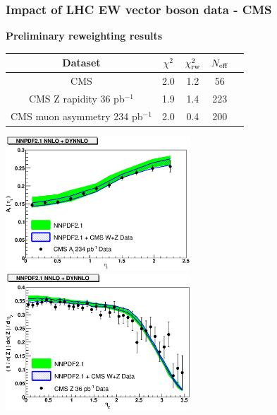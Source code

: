 \documentclass[10pt]{beamer}
\begin{document}
\begin{frame}
\frametitle{Impact of LHC EW vector boson data - CMS}
\textbf{\footnotesize Preliminary reweighting results}
\begin{table}[h]
\scriptsize
\begin{center}
\begin{tabular}{|c|c|c|c|c|}
\hline
Dataset  &  $\chi^2$  &  $\chi^2_{\rm rw} $ & $N_{\rm eff}$  \\
\hline
\hline
CMS  & 2.0       & 1.2   &  56   \\  
\hline
CMS Z rapidity 36 pb$^{-1}$  &    1.9    & 1.4  &  223  \\  
CMS muon asymmetry 234 pb$^{-1}$      &  2.0   & 0.4   & 200   \\  
\hline
\end{tabular}
\end{center}
\end{table}
\begin{center}
\includegraphics[width=0.52\textwidth]{dat-th-cmswlasy}
\includegraphics[width=0.52\textwidth]{dat-th-cmsz}\\
\end{center}
\end{frame}
\end{document}
